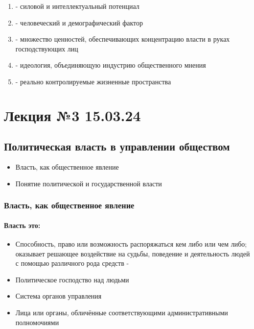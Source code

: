 \begin{enumerate}
      \item {} - силовой и интеллектуальный потенциал
      \item {} - человеческий и демографический фактор
      \item {} - множество ценностей, обеспечивающих концентрацию
            власти в руках господствующих лиц
      \item {} - идеология, объединяющую индустрию
            общественного мнения
      \item {} - реально контролируемые жизненные пространства
\end{enumerate}

\chapter{Лекция №3 15.03.24}

\section{Политическая власть в управлении обществом}

\begin{itemize}
      \item Власть, как общественное явление
      \item Понятие политической и государственной власти
\end{itemize}

\subsection{Власть, как общественное явление}

\subsubsection{Власть это:}

\begin{itemize}
      \item Способность, право или возможность распоряжаться кем либо или чем либо;
            оказывает решающее воздействие на судьбы, поведение и деятельность людей с
            помощью различного рода средств - 
      \item Политическое господство над людьми
      \item Система органов управления
      \item Лица или органы, обличённые соответствующими административными полномочиями
\end{itemize}


